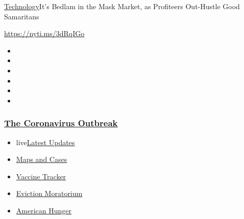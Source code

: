 \href{/section/technology}{Technology}\textbar{}It's Bedlam in the Mask
Market, as Profiteers Out-Hustle Good Samaritans

\url{https://nyti.ms/3dRqIGo}

\begin{itemize}
\item
\item
\item
\item
\item
\item
\end{itemize}

\hypertarget{the-coronavirus-outbreak}{%
\subsubsection{\texorpdfstring{\href{https://www.nytimes3xbfgragh.onion/news-event/coronavirus?name=styln-coronavirus-markets\&region=TOP_BANNER\&block=storyline_menu_recirc\&action=click\&pgtype=Article\&impression_id=41c13230-efb9-11ea-b9cb-2d2e06a937fe\&variant=undefined}{The
Coronavirus
Outbreak}}{The Coronavirus Outbreak}}\label{the-coronavirus-outbreak}}

\begin{itemize}
\tightlist
\item
  live\href{https://www.nytimes3xbfgragh.onion/2020/09/05/world/coronavirus-covid.html?name=styln-coronavirus-markets\&region=TOP_BANNER\&block=storyline_menu_recirc\&action=click\&pgtype=Article\&impression_id=41c13231-efb9-11ea-b9cb-2d2e06a937fe\&variant=undefined}{Latest
  Updates}
\item
  \href{https://www.nytimes3xbfgragh.onion/interactive/2020/us/coronavirus-us-cases.html?name=styln-coronavirus-markets\&region=TOP_BANNER\&block=storyline_menu_recirc\&action=click\&pgtype=Article\&impression_id=41c13232-efb9-11ea-b9cb-2d2e06a937fe\&variant=undefined}{Maps
  and Cases}
\item
  \href{https://www.nytimes3xbfgragh.onion/interactive/2020/science/coronavirus-vaccine-tracker.html?name=styln-coronavirus-markets\&region=TOP_BANNER\&block=storyline_menu_recirc\&action=click\&pgtype=Article\&impression_id=41c15940-efb9-11ea-b9cb-2d2e06a937fe\&variant=undefined}{Vaccine
  Tracker}
\item
  \href{https://www.nytimes3xbfgragh.onion/2020/09/02/your-money/eviction-moratorium-covid.html?name=styln-coronavirus-markets\&region=TOP_BANNER\&block=storyline_menu_recirc\&action=click\&pgtype=Article\&impression_id=41c15941-efb9-11ea-b9cb-2d2e06a937fe\&variant=undefined}{Eviction
  Moratorium}
\item
  \href{https://www.nytimes3xbfgragh.onion/interactive/2020/09/02/magazine/food-insecurity-hunger-us.html?name=styln-coronavirus-markets\&region=TOP_BANNER\&block=storyline_menu_recirc\&action=click\&pgtype=Article\&impression_id=41c15942-efb9-11ea-b9cb-2d2e06a937fe\&variant=undefined}{American
  Hunger}
\end{itemize}

